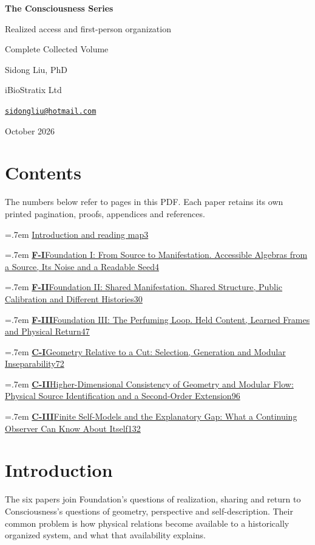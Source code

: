 \documentclass[11pt,a4paper]{article}
\newcommand{\volumeentry}[3]{\par\begingroup\parskip=.7em
  \noindent\href{Consciousness_Series_Complete_Collection.pdf\#page=#3}{\textbf{#1}\quad #2\nobreak\dotfill\nobreak\mbox{#3}}\par\endgroup}
\begin{document}
\begin{titlepage}
\centering
\vspace*{1.6cm}
{\Huge\bfseries The Consciousness Series\par}
\vspace{1cm}
{\Large Realized access and first-person organization\par}
\vfill
{\Large Complete Collected Volume\par}
\vspace{1.6cm}
{\Large Sidong Liu, PhD\par}
\vspace{.3cm}
{iBioStratix Ltd\par}
\href{mailto:sidongliu@hotmail.com}{\texttt{sidongliu@hotmail.com}}\par
\vspace{1cm}
{\large October 2026\par}
\end{titlepage}
\setcounter{page}{2}
\section*{Contents}
The numbers below refer to pages in this PDF. Each paper retains its own printed pagination, proofs, appendices and references.
\volumeentry{}{Introduction and reading map}{3}
\volumeentry{F-I}{Foundation I: From Source to Manifestation. Accessible Algebras from a Source, Its Noise and a Readable Seed}{4}
\volumeentry{F-II}{Foundation II: Shared Manifestation. Shared Structure, Public Calibration and Different Histories}{30}
\volumeentry{F-III}{Foundation III: The Perfuming Loop. Held Content, Learned Frames and Physical Return}{47}
\volumeentry{C-I}{Geometry Relative to a Cut: Selection, Generation and Modular Inseparability}{72}
\volumeentry{C-II}{Higher-Dimensional Consistency of Geometry and Modular Flow: Physical Source Identification and a Second-Order Extension}{96}
\volumeentry{C-III}{Finite Self-Models and the Explanatory Gap: What a Continuing Observer Can Know About Itself}{132}
\clearpage
\section*{Introduction}\label{collection:intro}
The six papers join Foundation's questions of realization, sharing and return to Consciousness's questions of geometry, perspective and self-description. Their common problem is how physical relations become available to a historically organized system, and what that availability explains.
\end{document}
